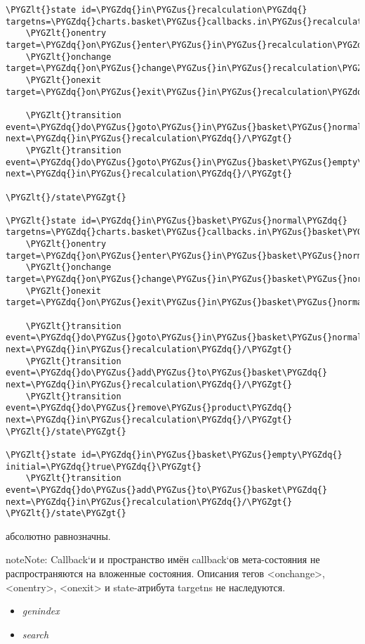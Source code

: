 \documentclass[letterpaper,10pt,english]{sphinxmanual}
\def\PYGZus{\char`\_}
\def\PYGZlt{\char`\<}
\def\PYGZgt{\char`\>}
\def\PYGZdq{\char`\"}
\begin{document}
\begin{Verbatim}[commandchars=\\\{\}]
\PYGZlt{}state id=\PYGZdq{}in\PYGZus{}recalculation\PYGZdq{} targetns=\PYGZdq{}charts.basket\PYGZus{}callbacks.in\PYGZus{}recalculation\PYGZdq{}\PYGZgt{}
    \PYGZlt{}onentry target=\PYGZdq{}on\PYGZus{}enter\PYGZus{}in\PYGZus{}recalculation\PYGZdq{}/\PYGZgt{}
    \PYGZlt{}onchange target=\PYGZdq{}on\PYGZus{}change\PYGZus{}in\PYGZus{}recalculation\PYGZdq{}/\PYGZgt{}
    \PYGZlt{}onexit target=\PYGZdq{}on\PYGZus{}exit\PYGZus{}in\PYGZus{}recalculation\PYGZdq{}/\PYGZgt{}

    \PYGZlt{}transition event=\PYGZdq{}do\PYGZus{}goto\PYGZus{}in\PYGZus{}basket\PYGZus{}normal\PYGZdq{} next=\PYGZdq{}in\PYGZus{}recalculation\PYGZdq{}/\PYGZgt{}
    \PYGZlt{}transition event=\PYGZdq{}do\PYGZus{}goto\PYGZus{}in\PYGZus{}basket\PYGZus{}empty\PYGZdq{} next=\PYGZdq{}in\PYGZus{}recalculation\PYGZdq{}/\PYGZgt{}

\PYGZlt{}/state\PYGZgt{}

\PYGZlt{}state id=\PYGZdq{}in\PYGZus{}basket\PYGZus{}normal\PYGZdq{} targetns=\PYGZdq{}charts.basket\PYGZus{}callbacks.in\PYGZus{}basket\PYGZus{}normal\PYGZdq{}\PYGZgt{}
    \PYGZlt{}onentry target=\PYGZdq{}on\PYGZus{}enter\PYGZus{}in\PYGZus{}basket\PYGZus{}normal\PYGZdq{}/\PYGZgt{}
    \PYGZlt{}onchange target=\PYGZdq{}on\PYGZus{}change\PYGZus{}in\PYGZus{}basket\PYGZus{}normal\PYGZdq{}/\PYGZgt{}
    \PYGZlt{}onexit target=\PYGZdq{}on\PYGZus{}exit\PYGZus{}in\PYGZus{}basket\PYGZus{}normal\PYGZdq{}/\PYGZgt{}

    \PYGZlt{}transition event=\PYGZdq{}do\PYGZus{}goto\PYGZus{}in\PYGZus{}basket\PYGZus{}normal\PYGZdq{} next=\PYGZdq{}in\PYGZus{}recalculation\PYGZdq{}/\PYGZgt{}
    \PYGZlt{}transition event=\PYGZdq{}do\PYGZus{}add\PYGZus{}to\PYGZus{}basket\PYGZdq{} next=\PYGZdq{}in\PYGZus{}recalculation\PYGZdq{}/\PYGZgt{}
    \PYGZlt{}transition event=\PYGZdq{}do\PYGZus{}remove\PYGZus{}product\PYGZdq{} next=\PYGZdq{}in\PYGZus{}recalculation\PYGZdq{}/\PYGZgt{}
\PYGZlt{}/state\PYGZgt{}

\PYGZlt{}state id=\PYGZdq{}in\PYGZus{}basket\PYGZus{}empty\PYGZdq{} initial=\PYGZdq{}true\PYGZdq{}\PYGZgt{}
    \PYGZlt{}transition event=\PYGZdq{}do\PYGZus{}add\PYGZus{}to\PYGZus{}basket\PYGZdq{} next=\PYGZdq{}in\PYGZus{}recalculation\PYGZdq{}/\PYGZgt{}
\PYGZlt{}/state\PYGZgt{}
\end{Verbatim}

абсолютно равнозначны.

\begin{notice}{note}{Note:}
Callback{}`и и пространство имён callback{}`ов мета-состояния не распространяются на вложенные состояния. Описания тегов \textless{}onchange\textgreater{}, \textless{}onentry\textgreater{}, \textless{}onexit\textgreater{} и state-атрибута targetns не наследуются.
\end{notice}
\begin{itemize}
\item {} 
\emph{genindex}

\item {} 
\emph{search}

\end{itemize}



\renewcommand{\indexname}{Index}
\printindex
\end{document}
